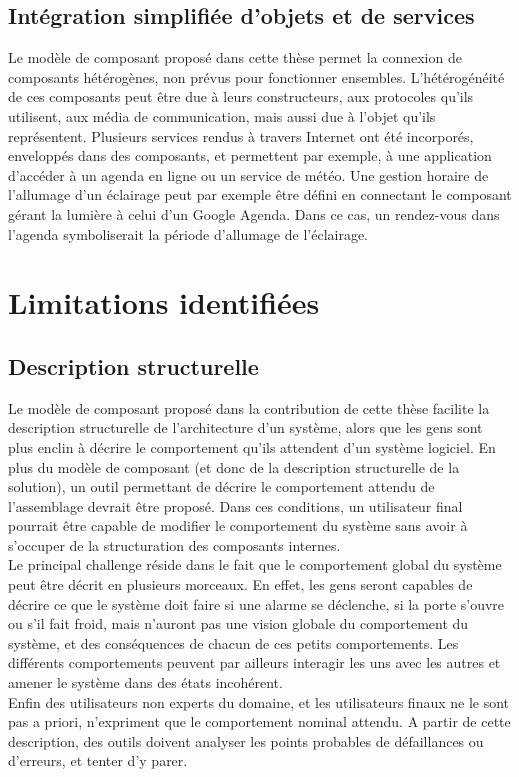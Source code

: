 \subsection{Intégration simplifiée d'objets et de services}
Le modèle de composant proposé dans cette thèse permet la connexion de composants hétérogènes, non prévus pour fonctionner ensembles. L'hétérogénéité de ces composants peut être due à leurs constructeurs, aux protocoles qu'ils utilisent, aux média de communication, mais aussi due à l'objet qu'ils représentent. Plusieurs services rendus à travers Internet ont été incorporés, enveloppés dans des composants, et permettent par exemple, à une application d'accéder à un agenda en ligne ou un service de météo. Une gestion horaire de l'allumage d'un éclairage peut par exemple \^etre défini en connectant le composant gérant la lumière à celui d'un Google Agenda. Dans ce cas, un rendez-vous dans l'agenda symboliserait la période d'allumage de l'éclairage.


\section{Limitations identifiées}

\subsection{Description structurelle}

Le modèle de composant proposé dans la contribution de cette thèse facilite la description structurelle de l'architecture d'un système, alors que les gens sont plus enclin à décrire le comportement qu'ils attendent d'un système logiciel. En plus du modèle de composant (et donc de la description structurelle de la solution), un outil permettant de décrire le comportement attendu de l'assemblage devrait être proposé. Dans ces conditions, un utilisateur final pourrait être capable de modifier le comportement du système sans avoir à s'occuper de la structuration des composants internes.\\
Le principal challenge réside dans le fait que le comportement global du système peut être décrit en plusieurs morceaux. En effet, les gens seront capables de décrire ce que le système doit faire si une alarme se déclenche, si la porte s'ouvre ou s'il fait froid, mais n'auront pas une vision globale du comportement du système, et des conséquences de chacun de ces petits comportements. Les différents comportements peuvent par ailleurs interagir les uns avec les autres et amener le système dans des états incohérent.\\
Enfin des utilisateurs non experts du domaine, et les utilisateurs finaux ne le sont pas a priori, n'expriment que le comportement nominal attendu. A partir de cette description, des outils doivent analyser les points probables de défaillances ou d'erreurs, et tenter d'y parer.

